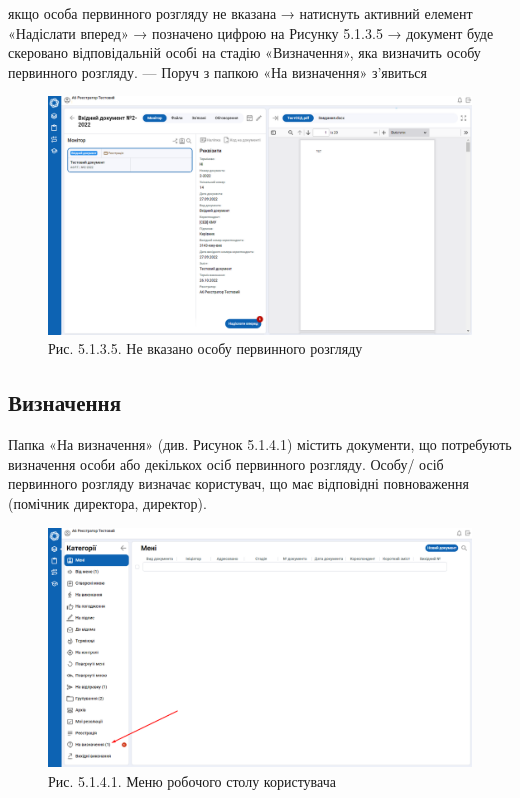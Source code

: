 якщо особа первинного розгляду не вказана → натиснуть активний елемент
«Надіслати вперед» → позначено цифрою  на Рисунку 5.1.3.5 → документ
буде скеровано відповідальній особі на стадію «Визначення», яка визначить особу первинного розгляду.
--- Поруч з папкою «На визначення» з'явиться

\begin{figure}[!htbp]
\centerline{\includegraphics[width=\textwidth]{img/5.1.3.5.png}}
\caption{Рис. 5.1.3.5. Не вказано особу первинного розгляду}
\end{figure}

\subsection{Визначення}

Папка «На визначення» (див. Рисунок 5.1.4.1) містить документи, що потребують
визначення особи або декількох осіб первинного розгляду.
Особу/ осіб первинного розгляду визначає користувач, що має відповідні
повноваження (помічник директора, директор).

\begin{figure}[!htbp]
\centerline{\includegraphics[width=\textwidth]{img/5.1.4.1.png}}
\caption{Рис. 5.1.4.1. Меню робочого столу користувача}
\end{figure}

